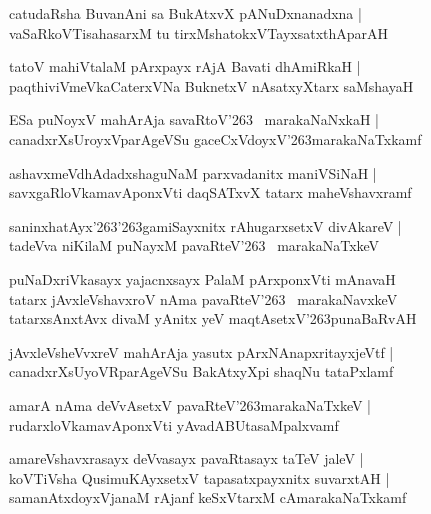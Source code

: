 \documentclass[twoside,12pt,openright]{book}
\def\S{\char'263}
\newcounter{shloka}[chapter]
\begin{document}
\begin{shloka}
catudaRsha BuvanAni sa BukAtxvX pANuDxnanadxna |\\
vaSaRkoVTisahasarxM tu tirxMshatokxVTayxsatxthAparAH
\end{shloka}


\begin{shloka}
tatoV mahiVtalaM pArxpayx rAjA Bavati dhAmiRkaH |\\
paqthiviVmeVkaCaterxVNa BuknetxV nAsatxyXtarx saMshayaH 
\end{shloka}

\begin{shloka}
ESa puNoyxV mahArAja savaRtoV\S ~ marakaNaNxkaH |\\
canadxrXsUroyxVparAgeVSu gaceCxVdoyxV\S marakaNaTxkamf
\end{shloka}

\begin{shloka}
ashavxmeVdhAdadxshaguNaM parxvadanitx maniVSiNaH |\\
savxgaRloVkamavAponxVti daqSATxvX tatarx maheVshavxramf 
\end{shloka}

\begin{shloka}
saninxhatAyx\S\S gamiSayxnitx rAhugarxsetxV divAkareV |\\
tadeVva niKilaM puNayxM pavaRteV\S ~ marakaNaTxkeV 
\end{shloka}

\begin{shloka}
puNaDxriVkasayx yajacnxsayx PalaM pArxponxVti mAnavaH \\
tatarx jAvxleVshavxroV nAma pavaRteV\S ~ marakaNavxkeV \\
tatarxsAnxtAvx divaM yAnitx yeV maqtAsetxV\S punaBaRvAH
\end{shloka}

\begin{shloka}
jAvxleVsheVvxreV mahArAja yasutx pArxNAnapxritayxjeVtf |\\
canadxrXsUyoVRparAgeVSu BakAtxyXpi shaqNu tataPxlamf 
\end{shloka}

\begin{shloka}
amarA nAma deVvAsetxV  pavaRteV\S marakaNaTxkeV |\\
rudarxloVkamavAponxVti yAvadABUtasaMpalxvamf 
\end{shloka}

\begin{shloka}
amareVshavxrasayx deVvasayx pavaRtasayx taTeV jaleV |\\
koVTiVsha QusimuKAyxsetxV tapasatxpayxnitx suvarxtAH |\\
samanAtxdoyxVjanaM rAjanf keSxVtarxM cAmarakaNaTxkamf  
\end{shloka}
\end{document}
